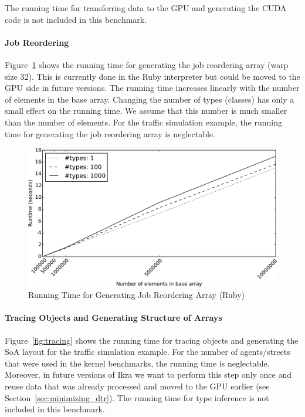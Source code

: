 \documentclass[preprint]{sigplanconf}
\begin{document}
The running time for transferring data to the GPU and generating the CUDA code is not included in this benchmark.

\paragraph{Job Reordering}
Figure~\ref{fig:job_reorder_arr} shows the running time for generating the job reordering array (warp size 32). This is currently done in the Ruby interpreter but could be moved to the GPU side in future versions. The running time increases linearly with the number of elements in the base array. Changing the number of types (classes) has only a small effect on the running time. We assume that this number is much smaller than the number of elements. For the traffic simulation example, the running time for generating the job reordering array is neglectable.

\begin{figure}[!htp]
    \includegraphics[width=\columnwidth]{plot_reorder.pdf}
    \centering
    \caption{Running Time for Generating Job Reordering Array (Ruby)}
    \label{fig:job_reorder_arr}
\end{figure}

\paragraph{Tracing Objects and Generating Structure of Arrays}
Figure~\ref{fig:tracing} shows the running time for tracing objects and generating the SoA layout for the traffic simulation example. For the number of agents/streets that were used in the kernel benchmarks, the running time is neglectable. Moreover, in future versions of Ikra we want to perform this step only once and reuse data that was already processed and moved to the GPU earlier (see Section~\ref{sec:minimizing_dtr}). The running time for type inference is not included in this benchmark.
\end{document}
